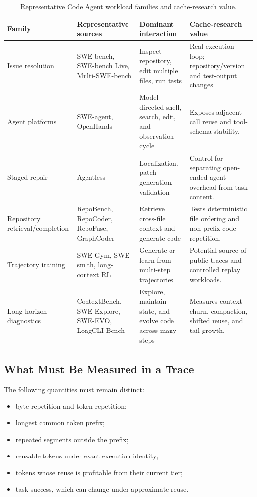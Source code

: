 \documentclass[conference,10pt]{IEEEtran}
\begin{document}
\begin{table}[t]
\caption{Representative Code Agent workload families and cache-research value.}
\label{tab:workloads}
\centering
\small
\begin{tabularx}{\textwidth}{p{}p{}p{}Y}
\toprule
Family & Representative sources & Dominant interaction & Cache-research value \\
\midrule
Issue resolution & SWE-bench, SWE-bench Live, Multi-SWE-bench & Inspect repository, edit multiple files, run tests & Real execution loop; repository/version and test-output changes. \\
Agent platforms & SWE-agent, OpenHands & Model-directed shell, search, edit, and observation cycle & Exposes adjacent-call reuse and tool-schema stability. \\
Staged repair & Agentless & Localization, patch generation, validation & Control for separating open-ended agent overhead from task content. \\
Repository retrieval/completion & RepoBench, RepoCoder, RepoFuse, GraphCoder & Retrieve cross-file context and generate code & Tests deterministic file ordering and non-prefix code repetition. \\
Trajectory training & SWE-Gym, SWE-smith, long-context RL & Generate or learn from multi-step trajectories & Potential source of public traces and controlled replay workloads. \\
Long-horizon diagnostics & ContextBench, SWE-Explore, SWE-EVO, LongCLI-Bench & Explore, maintain state, and evolve code across many steps & Measures context churn, compaction, shifted reuse, and tail growth. \\
\bottomrule
\end{tabularx}
\end{table}

\subsection{What Must Be Measured in a Trace}

The following quantities must remain distinct:

\begin{itemize}
    \item byte repetition and token repetition;
    \item longest common token prefix;
    \item repeated segments outside the prefix;
    \item reusable tokens under exact execution identity;
    \item tokens whose reuse is profitable from their current tier;
    \item task success, which can change under approximate reuse.
\end{itemize}
\end{document}
